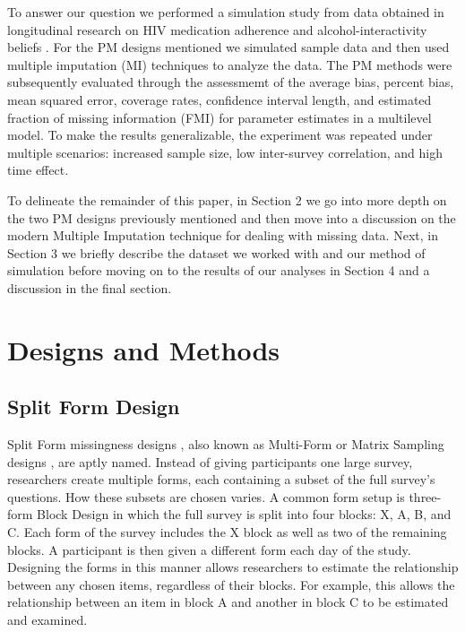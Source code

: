 \documentclass{svjour3}\usepackage[]{graphicx}\usepackage[]{color}
\begin{document}
To answer our question we performed a simulation study from data obtained in longitudinal research on HIV medication adherence and alcohol-interactivity beliefs \citep{pellowski2016alcohol}. For the PM designs mentioned we simulated sample data and then used multiple imputation (MI) \citep{little2014statistical}  techniques to analyze the data. The PM methods were subsequently evaluated through the assessmemt of the average bias, percent bias, mean squared error, coverage rates, confidence interval length, and estimated fraction of missing information (FMI) \citep{little2014statistical} for parameter estimates in a multilevel model. To make the results generalizable, the experiment was repeated under multiple scenarios: increased sample size, low inter-survey correlation, and high time effect. \par

To delineate the remainder of this paper, in Section 2 we go into more depth on the two PM designs previously mentioned and then move into a discussion on the modern Multiple Imputation technique for dealing with missing data. Next, in Section 3 we briefly describe the dataset we worked with and our method of simulation before moving on to the results of our analyses in Section 4 and a discussion in the final section. \par


\section{Designs and Methods}
\label{sec:1}
\subsection{Split Form Design}
\label{sec:1.1}

Split Form missingness designs \citep{raghunathan1995split}, also  known as Multi-Form \citep{little2013planned} or Matrix Sampling designs \citep{thomas2006evaluation}, are aptly named. Instead of giving participants one large survey, researchers create multiple forms, each containing a subset of the full survey's questions. How these subsets are chosen varies. A common form setup is three-form Block Design \citep{graham1996maximizing} in which the full survey is split into four blocks: X, A, B, and C. Each form of the survey includes the X block as well as two of the remaining blocks. A participant is then given a different form each day of the study. Designing the forms in this manner allows researchers to estimate the relationship between any chosen items, regardless of their blocks. For example, this allows the relationship between an item in block A and another in block C to be estimated and examined. \par
\end{document}
